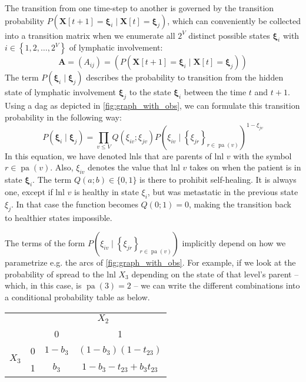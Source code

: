 \documentclass[twocolumn]{aastex631}
\begin{document}
The transition from one time-step to another is governed by the transition probability $P\left( \mathbf{X}[t+1]=\boldsymbol{\xi}_i \mid \mathbf{X}[t]=\boldsymbol{\xi}_j \right)$, which can conveniently be collected into a transition matrix when we enumerate all $2^V$ distinct possible states $\boldsymbol{\xi}_i$ with $i \in \left\{ 1,2, \ldots, 2^V \right\}$ of lymphatic involvement:
%
\begin{equation}
    \mathbf{A} = \left( A_{ij} \right) = \left( P\left( \mathbf{X}[t+1]=\boldsymbol{\xi}_i \mid \mathbf{X}[t]=\boldsymbol{\xi}_j \right) \right)
\end{equation}
%
The term $P\left( \boldsymbol{\xi}_i \mid \boldsymbol{\xi}_j \right)$ describes the probability to transition from the hidden state of lymphatic involvement $\boldsymbol{\xi}_j$ to the state $\boldsymbol{\xi}_i$ between the time $t$ and $t+1$. Using a \gls{dag} as depicted in \cref{fig:graph_with_obs}, we can formulate this transition probability in the following way:
%
\begin{equation}
    \label{eq:transition_prob}
    P\left( \boldsymbol{\xi}_i \mid \boldsymbol{\xi}_j \right) = \prod_{v \leq V} Q\left( \xi_{iv} ; \xi_{jv} \right) P \left( \xi_{iv} \mid \left\{ \xi_{jr} \right\}_{r \in \operatorname{pa}(v)} \right)^{1 - \xi_{jv}}
\end{equation}
%
In this equation, we have denoted \glspl{lnl} that are parents of \gls{lnl} $v$ with the symbol $r\in\operatorname{pa}(v)$. Also, $\xi_{iv}$ denotes the value that \gls{lnl} $v$ takes on when the patient is in state $\boldsymbol{\xi}_i$. The term $Q(a;b) \in \{ 0,1 \}$ is there to prohibit self-healing. It is always one, except if \gls{lnl} $v$ is healthy in state $\xi_i$, but was metastatic in the previous state $\xi_j$. In that case the function becomes $Q(0;1) = 0$, making the transition back to healthier states impossible.

The terms of the form $P \left( \xi_{iv} \mid \left\{ \xi_{jr} \right\}_{r \in \operatorname{pa}(v)} \right)$ implicitly depend on how we parametrize e.g. the arcs of \cref{fig:graph_with_obs}. For example, if we look at the probability of spread to the \gls{lnl} $X_3$ depending on the state of that level's parent -- which, in this case, is $\operatorname{pa}(3) = 2$ -- we can write the different combinations into a conditional probability table as below.

\noindent
\begin{center}
    \begin{tabular}{|cc|cc|}
        \hline
        & & \multicolumn{2}{c|}{$X_2$} \\
        & & 0 & 1 \\
        \hline
        \multirow{2}{*}{$X_3$} & 0 & $1 - b_3$ & $(1 - b_3)(1 - t_{23})$ \\
        & 1 & $b_3$ & $1 - b_3 - t_{23} + b_3 t_{23}$ \\
        \hline
    \end{tabular}
\end{center}
\end{document}
